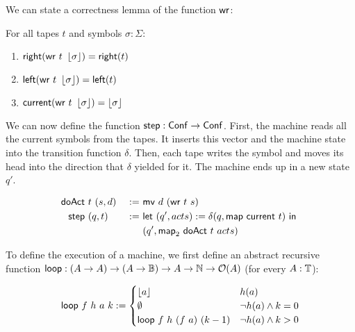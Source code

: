 We can state a correctness lemma of the function $\MS{wr}$:

\begin{fact}[Correctness of $\MS{wr}$]
  \label{lem:write}
  For all tapes $t$ and symbols $\sigma:\Sigma$:
  \begin{enumerate}
  \item $\mathsf{right}   (\mathsf{wr}~t~\left\lfloor {\sigma} \right\rfloor) = \mathsf{right}(t)$
  \item $\mathsf{left}    (\mathsf{wr}~t~\left\lfloor {\sigma} \right\rfloor) = \mathsf{left} (t)$
  \item $\mathsf{current} (\mathsf{wr}~t~\left\lfloor {\sigma} \right\rfloor) = \left\lfloor {\sigma} \right\rfloor$
  \end{enumerate}
\end{fact}

We can now define the function $\mathsf{step} : \mathsf{Conf} \rightarrow \mathsf{Conf}$.  First, the machine reads all the current symbols from the tapes.  It inserts this
vector and the machine state into the transition function $\delta$.  Then, each tape writes the symbol and moves its head into the direction that
$\delta$ yielded for it.  The machine ends up in a new state $q'$.

\begin{definition}[$\MS{step}$][step]
  \label{def:step}
  \begin{alignat*}{2}
    \mathsf{doAct} &~t~(s, d) &~:=~& \mathsf{mv}~d~(\mathsf{wr}~t~s) \\
    \mathsf{step}  &~(q, t)   &~:=~& \mathsf{let}~(q', acts) := \delta(q, \mathsf{map}~\mathsf{current}~t)~\mathsf{in}~ \\
               &          &~  ~& (q', \mathsf{map}_2~\mathsf{doAct}~t~acts)
  \end{alignat*}
\end{definition}

To define the execution of a machine, we first define an abstract recursive function
$\mathsf{loop} : (A \rightarrow A) \rightarrow (A \rightarrow \mathbb{B}) \rightarrow A \rightarrow \mathbb{N} \rightarrow \mathcal{O}(A)$ (for every $A:\mathbb{T}$):

\begin{definition}[$\Loop$][loop]
  \begin{align*}
    \mathsf{loop}~f~h~a~k :=
    \begin{cases}
      \left\lfloor {a} \right\rfloor               & h(a) \\
      \emptyset                  & \lnot h(a) \land k = 0 \\
      \mathsf{loop}~f~h~(f~a)~(k-1)  & \lnot h(a) \land k > 0
    \end{cases}
  \end{align*}
\end{definition}

